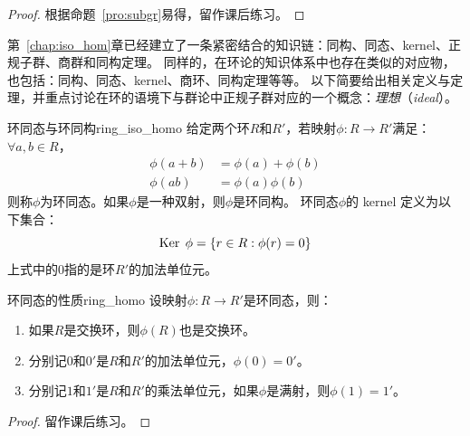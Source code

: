 \begin{proof}
根据命题~\ref{pro:subgr}易得，留作课后练习。
\end{proof}

第~\ref{chap:iso_hom}章已经建立了一条紧密结合的知识链：同构、同态、kernel、正规子群、商群和同构定理。
同样的，在环论的知识体系中也存在类似的对应物，也包括：同构、同态、kernel、商环、同构定理等等。
以下简要给出相关定义与定理，并重点讨论在环的语境下与群论中正规子群对应的一个概念：\emph{理想}（\emph{ideal}）。
\begin{definition}{环同态与环同构}{ring_iso_homo}
给定两个环$R$和$R'$，若映射$\phi\colon R \to R'$满足：$\forall a, b \in R$，
\begin{align*}
\phi(a + b) &= \phi(a) + \phi(b)\\
\phi(ab) &= \phi(a)\phi(b)
\end{align*}
则称$\phi$为环同态。如果$\phi$是一种双射，则$\phi$是环同构。
环同态$\phi$的 kernel 定义为以下集合：
\[\operatorname{Ker}\; \phi = \{r \in R: \phi(r) = 0\} \]
上式中的$0$指的是环$R'$的加法单位元。
\end{definition}

\begin{proposition}{环同态的性质}{ring_homo}
设映射$\phi\colon R \to R'$是环同态，则：
\begin{enumerate}
\item 如果$R$是交换环，则$\phi(R)$也是交换环。

\item 分别记$0$和$0'$是$R$和$R'$的加法单位元，$\phi(0) = 0'$。

\item 分别记$1$和$1'$是$R$和$R'$的乘法单位元，如果$\phi$是满射，则$\phi(1) = 1'$。
\end{enumerate}
\end{proposition}

\begin{proof}
留作课后练习。
\end{proof}

